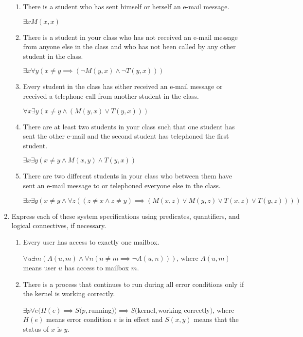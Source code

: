 \documentclass[11pt]{article}
\begin{document}
\begin{enumerate}[label=\textbf{\arabic*.}]
\begin{enumerate}[label=\textbf{\alph*)}]
		\item There is a student who has sent himself or herself an e-mail message.
		
		$\exists xM(x, x)$
		
		\item There is a student in your class who has not received an e-mail message from anyone else in the class and who has not been called by any other student in the class.
		
		$\exists x\forall y(x \ne y \implies (\neg M(y, x) \land \neg T(y, x)))$
		
		\item Every student in the class has either received an e-mail message or received a telephone call from another student in the class.
		
		$\forall x\exists y(x \ne y \land (M(y, x) \lor T(y, x)))$
		
		\item There are at least two students in your class such that one student has sent the other e-mail and the second student has telephoned the first student.
		
		$\exists x\exists y(x \ne y \land M(x, y) \land T(y, x))$
		
		\item There are two different students in your class who between them have sent an e-mail message to or telephoned everyone else in the class.
		
		$\exists x\exists y(x \ne y \land \forall z((z \ne x \land z \ne y) \implies (M(x, z) \lor M(y, z) \lor T(x, z) \lor T(y, z))))$
	\end{enumerate}

	\item Express each of these system specifications using predicates, quantifiers, and logical connectives, if necessary.
	\begin{enumerate}[label=\textbf{\alph*)}]
		\item Every user has access to exactly one mailbox.
		
		$\forall u\exists m(A(u, m) \land \forall n(n \ne m \implies \neg A(u, n)))$, where $A(u, m)$ means user $u$ has access to mailbox $m$.
		
		\item There is a process that continues to run during all error conditions only if the kernel is working correctly.
		
		$\exists p\forall e(H(e) \implies S(p,$running$)) \implies S($kernel$,$working correctly$)$, where $H(e)$ means error condition $e$ is in effect and $S(x, y)$ means that the status of $x$ is $y$.
		

\end{enumerate}
\end{enumerate}
\end{document}
